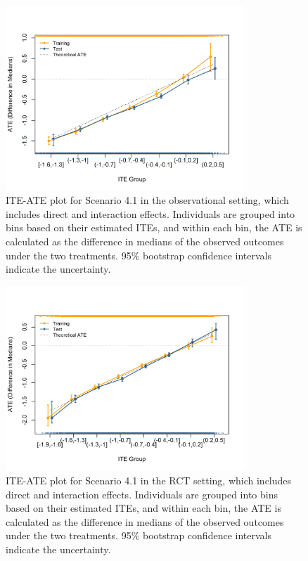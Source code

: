 \begin{figure}[htbp]
\centering
\includegraphics[width=0.8\textwidth]{img/results/observ_scenario1_ITE_ATE.png}
\vspace{-15pt}
\caption{ITE-ATE plot for Scenario 4.1 in the observational setting, which includes direct and interaction effects. Individuals are grouped into bins based on their estimated ITEs, and within each bin, the ATE is calculated as the difference in medians of the observed outcomes under the two treatments. 95\% bootstrap confidence intervals indicate the uncertainty.}
\label{fig:observ_scenario1_ite_ATE}
\end{figure}


\begin{figure}[htbp]
\centering
\includegraphics[width=0.8\textwidth]{img/results/rct_scenario1_ITE_ATE.png}
\vspace{-15pt}
\caption{ITE-ATE plot for Scenario 4.1 in the RCT setting, which includes direct and interaction effects. Individuals are grouped into bins based on their estimated ITEs, and within each bin, the ATE is calculated as the difference in medians of the observed outcomes under the two treatments. 95\% bootstrap confidence intervals indicate the uncertainty.}
\label{fig:rct_scenario1_ite_ATE}
\end{figure}


